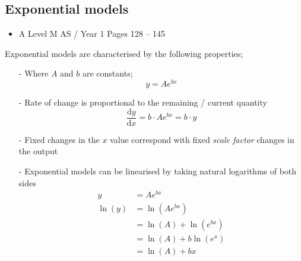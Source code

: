 \documentclass[11pt, a4paper]{article}
\begin{document}
\subsection{Exponential models}
\begin{itemize}
\item A Level M AS / Year 1 \hspace{1cm} \phantom{ } Pages 128 -- 145
\end{itemize} \par
Exponential models are characterised by the following properties;
\begin{itemize}
\item[-] Where $A$ and $b$ are constants;\begin{equation*}y=Ae^{bx}\end{equation*}
\item[-] Rate of change is proportional to the remaining / current quantity
\begin{equation*}\frac{\mathrm{d}y}{\mathrm{d}x}=b\cdot Ae^{bx}=b\cdot y \end{equation*}
\item[-] Fixed changes in the $x$ value correspond with fixed \emph{scale factor} changes in the output
\item[-]Exponential models can be linearised by taking natural logarithms of both sides
\begin{align*}
y&=Ae^{bx} \\
\ln(y)&=\ln\left(Ae^{bx}\right) \\
&=\ln(A)+\ln\left(e^{bx}\right) \\
&=\ln(A)+b\ln(e^{x}) \\
&=\ln(A)+bx
\end{align*}
\end{itemize}
\vspace{0.5cm}
\end{document}
